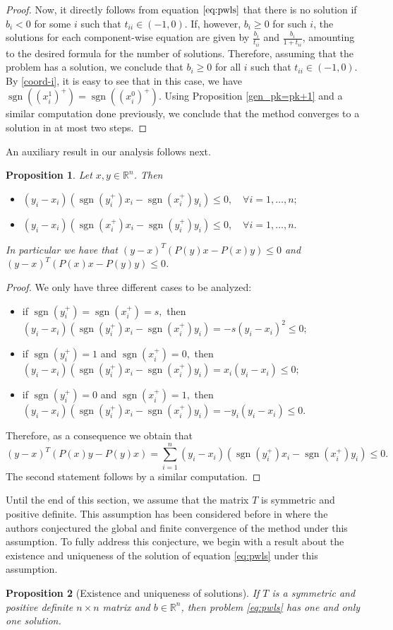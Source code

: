 \documentclass[11pt]{article}
\newtheorem{proposition}{Proposition}[section]
\DeclareMathOperator{\sgn}{sgn}
\newcommand{\R}{\mathbb R}
\begin{document}
\begin{proof}
Now, it directly follows from equation $\eqref{eq:pwls}$ that there is no solution if $b_i<0$ for some $i$ such that $t_{ii}\in(-1,0)$. If, however, $b_i\geq 0$ for such $i$, the solutions for each component-wise equation are given by $\frac{b_i}{t_{ii}}$ and $\frac{b_i}{1+t_{ii}}$, amounting to the desired formula for the number of solutions.
Therefore, assuming that the problem has a solution, we conclude that $b_i\geq0$ for all $i$ such that $t_{ii}\in(-1,0)$. By \eqref{coord-i}, it is easy to see that in this case, we have $\sgn((x^1_i)^+)=\sgn((x^0_i)^+)$. Using Proposition \ref{gen_pk=pk+1} and a similar computation done previously, we conclude that the method converges to a solution in at most two steps.
\end{proof}

An auxiliary result in our analysis follows next.

\begin{proposition} \label{prop_xpy-ypx}
Let $x,y \in \R^n$. Then
\begin{itemize}
\item[i)] $(y_i-x_i)(\sgn(y^+_i)x_i-\sgn(x^+_i)y_i) \leq 0, \quad \forall i = 1,\dots,n;$
\item[ii)] $(y_i-x_i)(\sgn(x^+_i)x_i-\sgn(y^+_i)y_i) \leq 0, \quad \forall i = 1,\dots,n.$
\end{itemize}
 In particular we have that $(y-x)^T(P(y)x-P(x)y) \leq 0$ and $(y-x)^T(P(x)x-P(y)y) \leq 0$.
\end{proposition}

\begin{proof} We only have three different cases to be analyzed:
\begin{itemize}
\item[1)] if $\sgn(y^+_i)=\sgn(x^+_i)=s,$ then
$ (y_i-x_i)(\sgn(y^+_i)x_i-\sgn(x^+_i)y_i) = -s(y_i-x_i)^2 \leq 0;$
\item[2)] if $\sgn(y^+_i)=1$ and $\sgn(x^+_i)=0,$ then
$ (y_i-x_i)(\sgn(y^+_i)x_i-\sgn(x^+_i)y_i) = x_i(y_i-x_i) \leq 0;$
\item[3)] if $\sgn(y^+_i)=0$ and $\sgn(x^+_i)=1,$ then
$ (y_i-x_i)(\sgn(y^+_i)x_i-\sgn(x^+_i)y_i) = -y_i(y_i-x_i) \leq 0.$
\end{itemize} Therefore, as a consequence we obtain that
$$(y-x)^T (P(x)y-P(y)x)= \sum_{i=1}^n (y_i-x_i)(\sgn(y^+_i)x_i-\sgn(x^+_i)y_i) \leq 0.$$ The second statement follows by a similar computation.
\end{proof}

Until the end of this section, we assume that the matrix $T$ is symmetric and positive definite. This assumption has been considered before in \cite{Bello-Cruz:2017} where the authors conjectured the global and finite convergence of the method under this assumption. To fully address this conjecture, we begin with a result about the existence and uniqueness of the solution of equation \eqref{eq:pwls} under this assumption. 
\begin{proposition}[Existence and uniqueness of solutions]\label{uniqueness-sol}
If $T$ is a symmetric and positive definite $n \times n$ matrix and $b \in \R^n$, then problem \eqref{eq:pwls} has one and only one solution.
\end{proposition}
\end{document}
